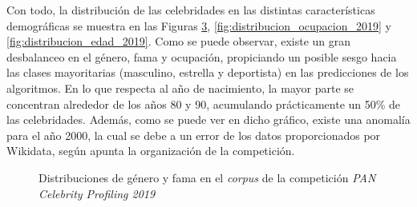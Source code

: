 \bigskip
Con todo, la distribución de las celebridades en las distintas características demográficas se muestra en las Figuras \ref{fig:distribuciones_genero_fama_2019},
\ref{fig:distribucion_ocupacion_2019} y \ref{fig:distribucion_edad_2019}. Como se puede observar, existe un gran desbalanceo
en el género, fama y ocupación, propiciando un posible sesgo hacia las clases mayoritarias (masculino, estrella y deportista) en las predicciones de los algoritmos.
En lo que respecta al año de nacimiento,
la mayor parte se concentran alrededor de los años 80 y 90, acumulando prácticamente un 50\% de las celebridades.
Además, como se puede ver en dicho gráfico, existe una anomalía
para el año 2000, la cual se debe a un error de los datos proporcionados por Wikidata, según apunta la organización de la competición.

\bigskip
\begin{figure}[H]
	\centering
	\begin{subfigure}{0.5\textwidth}
		\label{fig:distribucion_genero_2019}
	\end{subfigure}%
	\hfill
	\begin{subfigure}{0.5\textwidth}
		\label{fig:distribucion_fama_2019}
	\end{subfigure}
	\caption{Distribuciones de género y fama en el \textit{corpus} de la competición \textit{PAN Celebrity Profiling 2019}}
	\label{fig:distribuciones_genero_fama_2019}
\end{figure}

